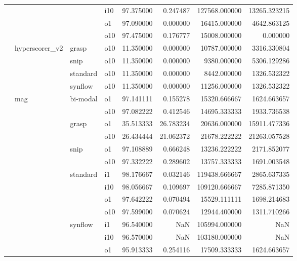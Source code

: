 \begin{longtable}{llllrrrr}
      &     &         & i10 &  97.375000 &   0.247487 &    127568.000000 &  13265.323215 \\
      &     &         & o1 &  97.090000 &   0.000000 &     16415.000000 &   4642.863125 \\
      &     &         & o10 &  97.475000 &   0.176777 &     15008.000000 &      0.000000 \\
      & hyperscorer\_v2 & grasp & o10 &  11.350000 &   0.000000 &     10787.000000 &   3316.330804 \\
      &     & snip & o10 &  11.350000 &   0.000000 &      9380.000000 &   5306.129286 \\
      &     & standard & o10 &  11.350000 &   0.000000 &      8442.000000 &   1326.532322 \\
      &     & synflow & o10 &  11.350000 &   0.000000 &     11256.000000 &   1326.532322 \\
      & mag & bi-modal & o1 &  97.141111 &   0.155278 &     15320.666667 &   1624.663657 \\
      &     &         & o10 &  97.082222 &   0.412546 &     14695.333333 &   1933.736538 \\
      &     & grasp & o1 &  35.513333 &  26.783234 &     20636.000000 &  15911.477336 \\
      &     &         & o10 &  26.434444 &  21.062372 &     21678.222222 &  21263.057528 \\
      &     & snip & o1 &  97.108889 &   0.666248 &     13236.222222 &   2171.852077 \\
      &     &         & o10 &  97.332222 &   0.289602 &     13757.333333 &   1691.003548 \\
      &     & standard & i1 &  98.176667 &   0.032146 &    119438.666667 &   2865.637335 \\
      &     &         & i10 &  98.056667 &   0.109697 &    109120.666667 &   7285.871350 \\
      &     &         & o1 &  97.642222 &   0.070494 &     15529.111111 &   1698.214683 \\
      &     &         & o10 &  97.599000 &   0.070624 &     12944.400000 &   1311.710266 \\
      &     & synflow & i1 &  96.540000 &        NaN &    105994.000000 &           NaN \\
      &     &         & i10 &  96.570000 &        NaN &    103180.000000 &           NaN \\
      &     &         & o1 &  95.913333 &   0.254116 &     17509.333333 &   1624.663657 \\

\end{longtable}
